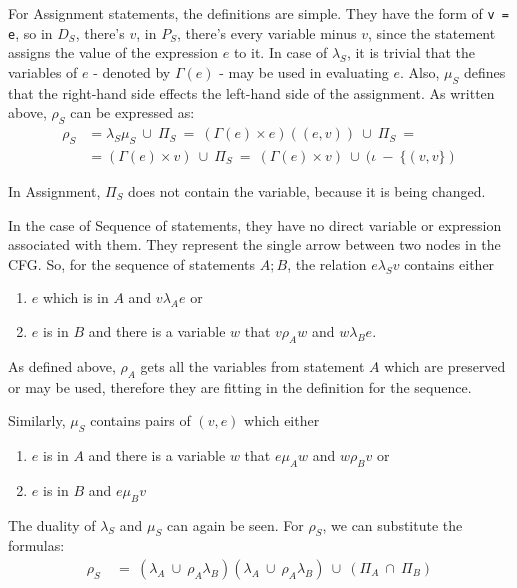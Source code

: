 \documentclass[oneside,12pt,a4paper]{book}
\begin{document}
For Assignment statements, the definitions are simple. They have the form of \texttt{v = e}, so in $D_S$, there's $v$, in $P_S$, there's every variable minus $v$, since the statement assigns the value of the expression $e$ to it. In case of $\lambda_S$, it is trivial that the variables of $e$ - denoted by $\Gamma(e)$ - may be used in evaluating $e$. Also, $\mu_S$ defines that the right-hand side effects the left-hand side of the assignment. As written above, $\rho_S$ can be expressed as:
\begin{equation}
\begin{split}
\rho_S &= \lambda_S\mu_S\ \cup\ \Pi_S\ =\ (\Gamma(e) \times {e})({(e,v)})\ \cup\ \Pi_S\ =\\
&= (\Gamma(e) \times {v})\ \cup\ \Pi_S\ =\ (\Gamma(e) \times {v})\ \cup\ (\iota\ -\ \{(v,v\})
\end{split}
\end{equation}

In Assignment, $\Pi_S$ does not contain the variable, because it is being changed.

In the case of Sequence of statements, they have no direct variable or expression associated with them. They represent the single arrow between two nodes in the CFG. So, for the sequence of statements $A;B$, the relation $e \lambda_S v$ contains either
\begin{enumerate}
\item $e$ which is in $A$ and $v \lambda_A e$ or
\item $e$ is in $B$ and there is a variable $w$ that $v \rho_A w$ and $w \lambda_B e$.
\end{enumerate}

As defined above, $\rho_A$ gets all the variables from statement $A$ which are preserved or may be used, therefore they are fitting in the definition for the sequence.

Similarly, $\mu_S$ contains pairs of $(v,e)$ which either
\begin{enumerate}
\item $e$ is in $A$ and there is a variable $w$ that $e \mu_A w$ and $w \rho_B v$ or
\item $e$ is in $B$ and $e \mu_B v$
\end{enumerate}

The duality of $\lambda_S$ and $\mu_S$ can again be seen.
For $\rho_S$, we can substitute the formulas:
\begin{equation}
\begin{split}
\rho_S\ &=\ (\lambda_A\ \cup\ \rho_A\lambda_B)(\lambda_A\ \cup\ \rho_A\lambda_B)\ \cup\ (\Pi_A\ \cap\ \Pi_B)
\end{split}
\end{equation}
\end{document}

